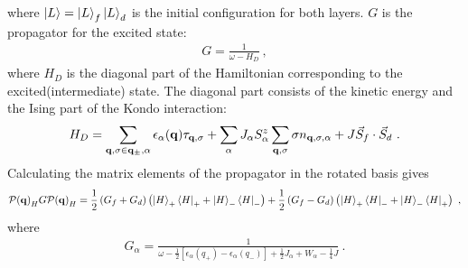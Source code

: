 \documentclass[%
reprint,
superscriptaddress,
groupedaddress,
superscriptaddress,
onecolumn,
10pt
]{revtex4-2}
\begin{document}
where \(\ket{L} = \ket{L}_f \ket{L}_d\) is the initial configuration for both layers. \(G\) is the propagator for the excited state:
\begin{equation}\begin{aligned}
	G = \frac{1}{\omega - H_D}~,
\end{aligned}\end{equation}
where \(H_D\) is the diagonal part of the Hamiltonian corresponding to the excited(intermediate) state. The diagonal part consists of the kinetic energy and the Ising part of the Kondo interaction:
\begin{equation}\begin{aligned}
	H_D = \sum_{{\bf q,\sigma}\in{\bf q}_\pm, \alpha}\epsilon_\alpha({\bf q})\tau_{{\bf q},\sigma} + \sum_\alpha J_\alpha S_\alpha^z \sum_{{\bf q},\sigma}\sigma n_{{\bf q},\sigma,\alpha} + J \vec{S}_f \cdot \vec{S}_d~.
\end{aligned}\end{equation}
Calculating the matrix elements of the propagator in the rotated basis gives
\begin{equation}\begin{aligned}\label{PGP}
	\mathcal{P({\bf q})}_H G \mathcal{P({\bf q})}_H = \frac{1}{2}\left(G_f + G_d\right)\left(\ket{H}_+\bra{H}_+ + \ket{H}_-\bra{H}_-\right) + \frac{1}{2}\left(G_f - G_d\right)\left(\ket{H}_+\bra{H}_- + \ket{H}_-\bra{H}_+\right)~,
\end{aligned}\end{equation}
where
\begin{equation}\begin{aligned}
	G_\alpha = \frac{1}{\omega - \frac{1}{2}\left[\epsilon_\alpha(q_+) - \epsilon_\alpha(q_-)\right] + \frac{1}{2}J_\alpha + W_\alpha - \frac{1}{4}J}~.
\end{aligned}\end{equation}
\end{document}
